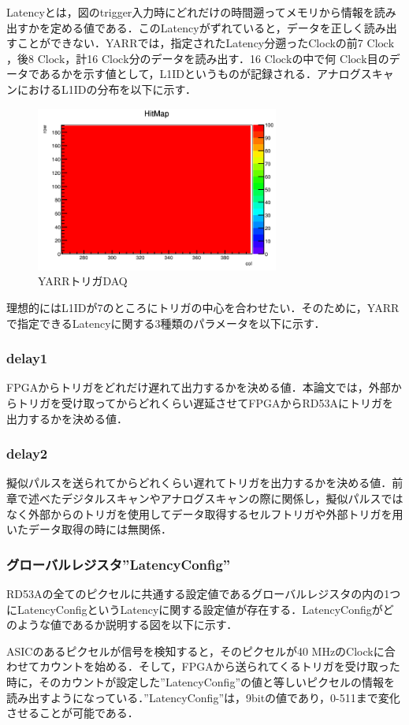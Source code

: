Latencyとは，図のtrigger入力時にどれだけの時間遡ってメモリから情報を読み出すかを定める値である．このLatencyがずれていると，データを正しく読み出すことができない．YARRでは，指定されたLatency分遡ったClockの前7 $\mathrm{Clock}$，後8 $\mathrm{Clock}$，計16 $\mathrm{Clock}$分のデータを読み出す．16 $\mathrm{Clock}$の中で何 $\mathrm{Clock}$目のデータであるかを示す値として，L1IDというものが記録される．アナログスキャンにおけるL1IDの分布を以下に示す．\par
\begin{figure}[h]
  \centering
  \includegraphics[width=8cm]{./figure/DigitalScan.png}
  \caption{YARRトリガDAQ}
  \label{fig:YARRDAQ}
\end{figure}


理想的にはL1IDが7のところにトリガの中心を合わせたい．そのために，YARRで指定できるLatencyに関する3種類のパラメータを以下に示す．
\subsubsection*{delay1}
FPGAからトリガをどれだけ遅れて出力するかを決める値．本論文では，外部からトリガを受け取ってからどれくらい遅延させてFPGAからRD53Aにトリガを出力するかを決める値．

\subsubsection*{delay2}
擬似パルスを送られてからどれくらい遅れてトリガを出力するかを決める値．前章で述べたデジタルスキャンやアナログスキャンの際に関係し，擬似パルスではなく外部からのトリガを使用してデータ取得するセルフトリガや外部トリガを用いたデータ取得の時には無関係．

\subsubsection*{グローバルレジスタ''LatencyConfig''}
RD53Aの全てのピクセルに共通する設定値であるグローバルレジスタの内の1つにLatencyConfigというLatencyに関する設定値が存在する．LatencyConfigがどのような値であるか説明する図を以下に示す．\par
ASICのあるピクセルが信号を検知すると，そのピクセルが40 $\mathrm{MHz}$のClockに合わせてカウントを始める．そして，FPGAから送られてくるトリガを受け取った時に，そのカウントが設定した''LatencyConfig''の値と等しいピクセルの情報を読み出すようになっている．''LatencyConfig''は，9bitの値であり，0-511まで変化させることが可能である．

